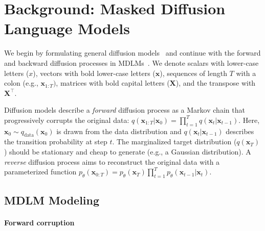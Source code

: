 \documentclass{article}
\begin{document}
\section{Background: Masked Diffusion Language Models}
We begin by formulating general diffusion models~\citep{sohl-dickstein_deep_2015} and continue with the forward and backward diffusion processes in MDLMs~\citep{gong_scaling_2025}. 
% 
We denote scalars with lower-case letters ($x$), vectors with bold lower-case letters ($\mathbf{x}$), sequences of length $T$ with a colon (e.g., $\mathbf{x}_{1:T})$, matrices with bold capital letters ($\mathbf{X}$), and the transpose with $\mathbf{X}^\top$. 
% 

Diffusion models describe a \emph{forward} diffusion process as a Markov chain that progressively corrupts the original data: $q(\mathbf{x}_{1:T} | \mathbf{x}_0) = \prod_{t=1}^T q(\mathbf{x}_t | \mathbf{x}_{t-1})$. 
%
Here, $\mathbf{x}_0\sim q_{\text{data}}(\mathbf{x}_0)$ is drawn from the data distribution and $q(\mathbf{x}_t | \mathbf{x}_{t-1})$ describes the transition probability at step $t$. 
% 
The marginalized target distribution ($q(\mathbf{x}_T)$) should be stationary and cheap to generate (e.g., a Gaussian distribution). 
% 
A \emph{reverse} diffusion process aims to reconstruct the original data with a parameterized function $p_\theta(\mathbf{x}_{0:T})=p_\theta(\mathbf{x}_{T})\prod_{t=1}^T p_\theta(\mathbf{x}_{t-1} | \mathbf{x}_t)$. 
% 

\subsection{MDLM Modeling}

\paragraph{Forward corruption}
\end{document}
